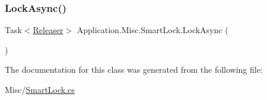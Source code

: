 \subsubsection{\texorpdfstring{Lock\+Async()}{LockAsync()}}
{\footnotesize\ttfamily Task$<$\mbox{\hyperlink{struct_application_1_1_misc_1_1_smart_lock_1_1_releaser}{Releaser}}$>$ Application.\+Misc.\+Smart\+Lock.\+Lock\+Async (\begin{DoxyParamCaption}{ }\end{DoxyParamCaption})}



The documentation for this class was generated from the following file\+:\begin{DoxyCompactItemize}
\item 
Misc/\mbox{\hyperlink{_smart_lock_8cs}{Smart\+Lock.\+cs}}\end{DoxyCompactItemize}
